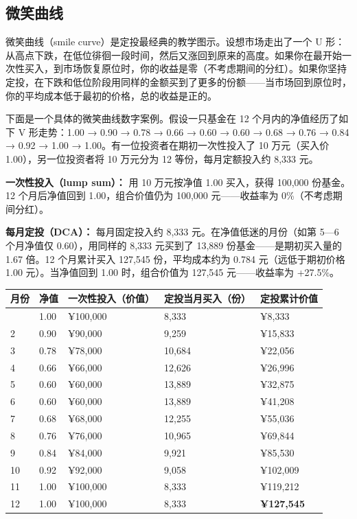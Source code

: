 \documentclass[a4paper,11pt,oneside,fontset=none,UTF8,zihao=-4]{ctexbook}
\begin{document}
\subsection{微笑曲线}\label{ux5faeux7b11ux66f2ux7ebf}

微笑曲线（smile curve）是定投最经典的教学图示。设想市场走出了一个 U
形：从高点下跌，在低位徘徊一段时间，然后又涨回到原来的高度。如果你在最开始一次性买入，到市场恢复原位时，你的收益是零（不考虑期间的分红）。如果你坚持定投，在下跌和低位阶段用同样的金额买到了更多的份额------当市场回到原位时，你的平均成本低于最初的价格，总的收益是正的。

下面是一个具体的微笑曲线数字案例。假设一只基金在 12
个月内的净值经历了如下 V 形走势：1.00 → 0.90 → 0.78 → 0.66 → 0.60 → 0.60
→ 0.68 → 0.76 → 0.84 → 0.92 → 1.00 →
1.00。有一位投资者在期初一次性投入了 10 万元（买入价
1.00），另一位投资者将 10 万元分为 12 等份，每月定额投入约 8,333 元。

\textbf{一次性投入（lump sum）：} 用 10 万元按净值 1.00 买入，获得
100,000 份基金。12 个月后净值回到 1.00，组合价值仍为 100,000
元------收益率为 0\%（不考虑期间分红）。

\textbf{每月定投（DCA）：} 每月固定投入约 8,333
元。在净值低迷的月份（如第 5---6 个月净值仅 0.60），用同样的 8,333
元买到了 13,889 份基金------是期初买入量的 1.67 倍。12 个月累计买入
127,545 份，平均成本约为 0.784 元（远低于期初价格 1.00 元）。当净值回到
1.00 时，组合价值为 127,545 元------收益率为 +27.5\%。

\begin{longtable}[]{@{}lllll@{}}
\toprule\noalign{}\rowcolor{dh-pink!25}
月份 & 净值 & 一次性投入（价值） & 定投当月买入（份） & 定投累计价值 \\
\midrule\noalign{}
\endhead
\bottomrule\noalign{}
\endlastfoot
1 & 1.00 & ¥100,000 & 8,333 & ¥8,333 \\
2 & 0.90 & ¥90,000 & 9,259 & ¥15,833 \\
3 & 0.78 & ¥78,000 & 10,684 & ¥22,056 \\
4 & 0.66 & ¥66,000 & 12,626 & ¥26,996 \\
5 & 0.60 & ¥60,000 & 13,889 & ¥32,875 \\
6 & 0.60 & ¥60,000 & 13,889 & ¥41,208 \\
7 & 0.68 & ¥68,000 & 12,255 & ¥55,036 \\
8 & 0.76 & ¥76,000 & 10,965 & ¥69,844 \\
9 & 0.84 & ¥84,000 & 9,921 & ¥85,530 \\
10 & 0.92 & ¥92,000 & 9,058 & ¥102,009 \\
11 & 1.00 & ¥100,000 & 8,333 & ¥119,212 \\
12 & 1.00 & ¥100,000 & 8,333 & \textbf{¥127,545} \\
\end{longtable}
\end{document}

